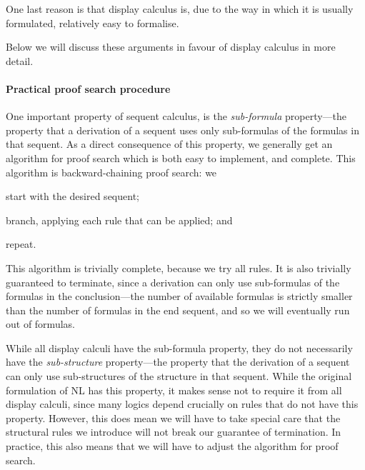 \documentclass[a4paper]{article}
\begin{document}
One last reason is that display calculus is, due to the way in which
it is usually formulated, relatively easy to formalise.

Below we will discuss these arguments in favour of display calculus in
more detail.

\paragraph{Practical proof search procedure}
One important property of sequent calculus, is the \emph{sub-formula}
property---the property that a derivation of a sequent uses only
sub-formulas of the formulas in that sequent.
As a direct consequence of this property, we generally get an
algorithm for proof search which is both easy to implement, and
complete. This algorithm is backward-chaining proof search: we
\begin{enumerate*}[label=(\arabic*)]
\item start with the desired sequent;
\item branch, applying each rule that can be applied; and
\item repeat.
\end{enumerate*}
This algorithm is trivially complete, because we try all rules. It is
also trivially guaranteed to terminate, since a derivation can only
use sub-formulas of the formulas in the conclusion---the number of
available formulas is strictly smaller than the number of formulas in
the end sequent, and so we will eventually run out of formulas.

While all display calculi have the sub-formula property, they do not
necessarily have the \emph{sub-structure} property---the property that
the derivation of a sequent can only use sub-structures of the
structure in that sequent. While the original formulation of NL
\citep{lambek1961} has this property, it makes sense not to require it
from all display calculi, since many logics depend crucially on rules
that do not have this property.
However, this does mean we will have to take special care that the
structural rules we introduce will not break our guarantee of
termination. In practice, this also means that we will have to adjust
the algorithm for proof search.
\end{document}

